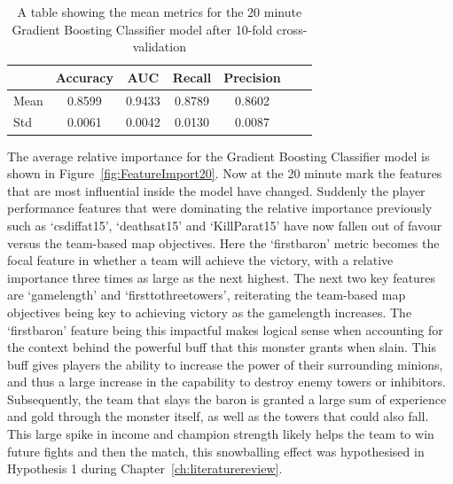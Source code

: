 \begin{table}[h]
    \centering
    \caption{A table showing the mean metrics for the 20 minute Gradient Boosting Classifier model after 10-fold cross-validation}
    \begin{tabular}{lcccccc}
        \toprule
        \textbf{} & \textbf{Accuracy} & \textbf{AUC} & \textbf{Recall} & \textbf{Precision} \\
        \midrule
        Mean & 0.8599 & 0.9433 & 0.8789 & 0.8602 \\
        Std & 0.0061 & 0.0042 & 0.0130 & 0.0087 \\
        \bottomrule
    \end{tabular}

    \label{tab:Kfold20}
\end{table}

The average relative importance for the Gradient Boosting Classifier model is shown in Figure~\ref{fig:FeatureImport20}.
Now at the 20 minute mark the features that are most influential inside the model have changed.
Suddenly the player performance features that were dominating the relative importance previously such as `csdiffat15', `deathsat15' and `KillParat15' have now fallen out of favour versus the team-based map objectives.
Here the `firstbaron' metric becomes the focal feature in whether a team will achieve the victory, with a relative importance three times as large as the next highest.
The next two key features are `gamelength' and `firsttothreetowers', reiterating the
team-based map objectives being key to achieving victory as the gamelength increases.
The `firstbaron' feature being this impactful makes logical sense when accounting for the context behind the powerful \gls{buff} that this monster grants when slain.
This \gls{buff} gives players the ability to increase the power of their surrounding \glspl{minion}, and thus a large increase in the capability to destroy enemy \glspl{tower} or \glspl{inhibitor}.
Subsequently, the team that slays the \gls{baron} is granted a large sum of experience and gold through the monster itself, as well as the towers that could also fall.
This large spike in income and champion strength likely  helps the team to win future fights and then the match, this snowballing effect was hypothesised in Hypothesis 1 during Chapter~\ref{ch:literaturereview}. \\

